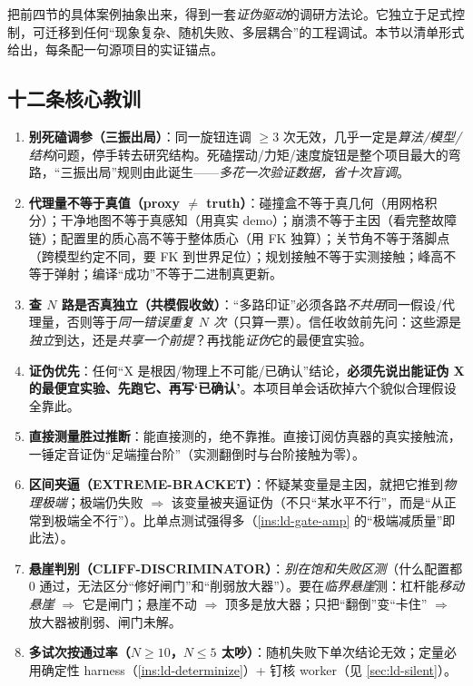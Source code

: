 把前四节的具体案例抽象出来，得到一套\emph{证伪驱动}的调研方法论。它独立于足式控制，可迁移到任何“现象复杂、随机失败、多层耦合”的工程调试。本节以清单形式给出，每条配一句源项目的实证锚点。

\subsection{十二条核心教训}
\label{subsec:ld-twelve}

\begin{enumerate}
  \item \textbf{别死磕调参（三振出局）}：同一旋钮连调 $\ge 3$ 次无效，几乎一定是\emph{算法/模型/结构}问题，停手转去研究结构。死磕摆动/力矩/速度旋钮是整个项目最大的弯路，“三振出局”规则由此诞生——\emph{多花一次验证数据，省十次盲调}。
  \item \textbf{代理量不等于真值（proxy $\ne$ truth）}：碰撞盒不等于真几何（用网格积分）；干净地图不等于真感知（用真实 demo）；崩溃不等于主因（看完整故障链）；配置里的质心高不等于整体质心（用 FK 独算）；关节角不等于落脚点（跨模型约定不同，要 FK 到世界足位）；规划接触不等于实测接触；峰高不等于弹射；编译“成功”不等于二进制真更新。
  \item \textbf{查 $N$ 路是否真独立（共模假收敛）}：“多路印证”必须各路\emph{不共用}同一假设/代理量，否则等于\emph{同一错误重复 $N$ 次}（只算一票）。信任收敛前先问：这些源是\emph{独立}到达，还是\emph{共享一个前提}？再找能\emph{证伪}它的最便宜实验。
  \item \textbf{证伪优先}：任何“X 是根因/物理上不可能/已确认”结论，\textbf{必须先说出能证伪 X 的最便宜实验、先跑它、再写‘已确认’}。本项目单会话砍掉六个貌似合理假设全靠此。
  \item \textbf{直接测量胜过推断}：能直接测的，绝不靠推。直接订阅仿真器的真实接触流，一锤定音证伪“足端撞台阶”（实测翻倒时与台阶接触为零）。
  \item \textbf{区间夹逼（EXTREME-BRACKET）}：怀疑某变量是主因，就把它推到\emph{物理极端}；极端仍失败 $\Rightarrow$ 该变量被夹逼证伪（不只“某水平不行”，而是“从正常到极端全不行”）。比单点测试强得多（\cref{ins:ld-gate-amp} 的“极端减质量”即此法）。
  \item \textbf{悬崖判别（CLIFF-DISCRIMINATOR）}：\emph{别在饱和失败区测}（什么配置都 $0$ 通过，无法区分“修好闸门”和“削弱放大器”）。要在\emph{临界悬崖}测：杠杆能\emph{移动悬崖} $\Rightarrow$ 它是闸门；悬崖不动 $\Rightarrow$ 顶多是放大器；只把“翻倒”变“卡住” $\Rightarrow$ 放大器被削弱、闸门未解。
  \item \textbf{多试次按通过率（$N\ge 10$，$N\le 5$ 太吵）}：随机失败下单次结论无效；定量必用确定性 harness（\cref{ins:ld-determinize}）+ 钉核 worker（见 \cref{sec:ld-silent}）。

\end{enumerate}
